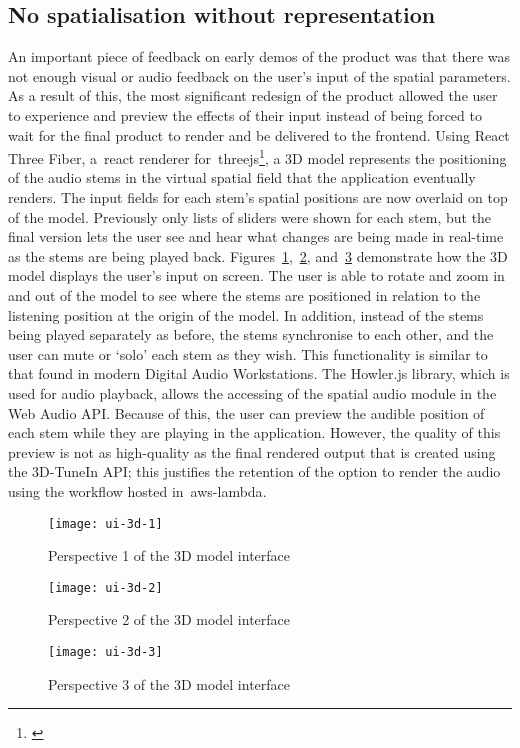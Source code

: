 \subsection{No spatialisation without representation}\label{subsec:no-spatialisation-without-representation}
An important piece of feedback on early demos of the product was that there was not enough visual or audio feedback on the user's input of the spatial parameters.
As a result of this,
the most significant redesign of the product allowed the user
to experience and preview the effects of their input
instead of being forced to wait for the final product to render and be delivered to the frontend.
Using React Three Fiber, a~\gls{react} renderer for~\gls{threejs}\footnote{\citep{dirksen2023learn}},
a 3D model represents the positioning of the audio stems in the virtual spatial field
that the application eventually renders.
The input fields for each stem's spatial positions are now overlaid on top of the model.
Previously only lists of sliders were shown for each stem,
but the final version lets
the user see and hear what changes are being made in real-time as the stems are being played back.
Figures~\ref{fig:ui-3d-1},~\ref{fig:ui-3d-2},
and~\ref{fig:ui-3d-3} demonstrate how the 3D model displays the user's input on screen.
The user is able
to rotate and zoom in and out of the model
to see where the stems are positioned in relation to the listening position at the origin of the model.
In addition, instead of the stems being played separately as before, the stems synchronise to each other,
and the user can mute or `solo' each stem as they wish.
This functionality is similar to that found in modern Digital Audio Workstations.
The Howler.js library,
which is used for audio playback, allows the accessing of the spatial audio module in the Web Audio API\@.
Because of this, the user can preview the audible position of each stem while they are playing in the application.
However,
the quality of this preview is not as high-quality as the final rendered output that is created using the 3D-TuneIn API;
this justifies the retention of the option to render the audio using the workflow hosted in~\gls{aws-lambda}.

\begin{figure}[!htb]
    \minipage{\textwidth}
    \texttt{[image: ui-3d-1]}
    \caption{Perspective 1 of the 3D model interface}\label{fig:ui-3d-1}
    \endminipage
\end{figure}

\begin{figure}[!htb]
    \minipage{\textwidth}
    \texttt{[image: ui-3d-2]}
    \caption{Perspective 2 of the 3D model interface}\label{fig:ui-3d-2}
    \endminipage
\end{figure}

\begin{figure}[!htb]
    \minipage{\textwidth}
    \texttt{[image: ui-3d-3]}
    \caption{Perspective 3 of the 3D model interface}\label{fig:ui-3d-3}
    \endminipage
\end{figure}